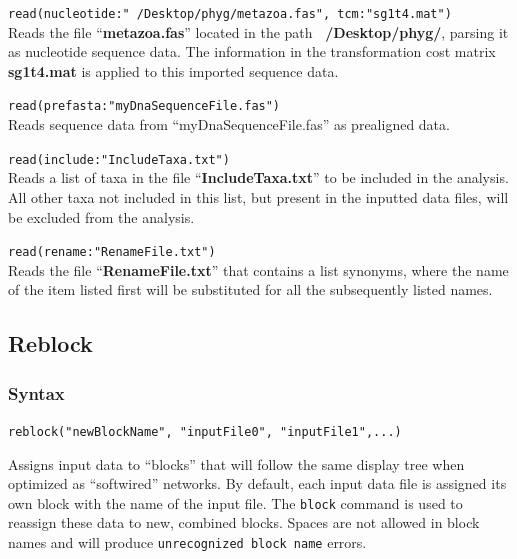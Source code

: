 	\begin{example}
		\item{\texttt{read(nucleotide:"~/Desktop/phyg/metazoa.fas", tcm:"sg1t4.mat")}\\ Reads the
		file ``\textbf{metazoa.fas}'' located in the path \textbf{~/Desktop/phyg/}, parsing it as 
		nucleotide sequence data. The information in the transformation cost matrix 
		\textbf{sg1t4.mat} is applied to this imported sequence data.}
		
		\item{\texttt{read(prefasta:"myDnaSequenceFile.fas")}\\ Reads sequence data from 
		``myDnaSequenceFile.fas'' as prealigned data.}
		
		\item{\texttt{read(include:"IncludeTaxa.txt")}\\ Reads a list of taxa in the file 
		``\textbf{IncludeTaxa.txt}'' to be included in the analysis. All other taxa not included 
		in this list, but present in the inputted data files, will be excluded from the analysis.}
		
		\item{\texttt{read(rename:"RenameFile.txt")}\\ Reads the file ``\textbf{RenameFile.txt}'' 
		that contains a list synonyms, where the name of the item listed first will be substituted 
		for all the subsequently listed names. }
	\end{example}
		
\subsection{Reblock}
\label{subsec:reblock}
	\subsubsection{Syntax}
		\texttt{reblock("newBlockName", "inputFile0", "inputFile1",...)}
	
	\begin{phygdescription}
		{Assigns input data to ``blocks'' that will follow the same display tree when optimized
		as ``softwired'' networks. By default, each input data file is assigned its own block with 
		the name of the input file. The \texttt{block} command is used to reassign these data to 
		new, combined blocks. Spaces are not allowed in block names and will produce 
		\texttt{unrecognized block name} errors.} 
	\end{phygdescription}
	
